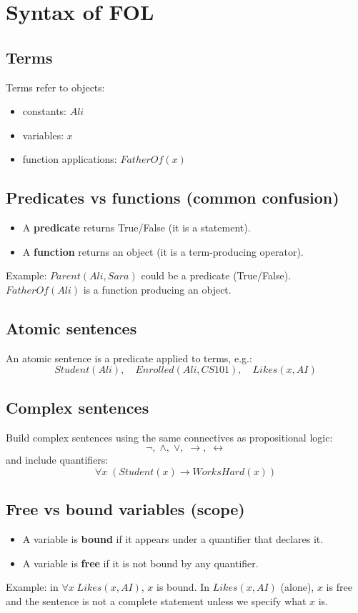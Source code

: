 \documentclass[11pt]{article}
\begin{document}
\section{Syntax of FOL}
\subsection{Terms}
Terms refer to objects:
\begin{itemize}[leftmargin=*]
  \item constants: $Ali$
  \item variables: $x$
  \item function applications: $FatherOf(x)$
\end{itemize}

\subsection{Predicates vs functions (common confusion)}
\begin{itemize}[leftmargin=*]
  \item A \textbf{predicate} returns True/False (it is a statement).
  \item A \textbf{function} returns an object (it is a term-producing operator).
\end{itemize}
Example: $Parent(Ali,Sara)$ could be a predicate (True/False). $FatherOf(Ali)$ is a function producing an object.

\subsection{Atomic sentences}
An atomic sentence is a predicate applied to terms, e.g.:
\[
  Student(Ali),\quad Enrolled(Ali, CS101),\quad Likes(x, AI)
\]

\subsection{Complex sentences}
Build complex sentences using the same connectives as propositional logic:
\[
  \lnot,\; \land,\; \lor,\; \rightarrow,\; \leftrightarrow
\]
and include quantifiers:
\[
  \forall x\; (Student(x) \rightarrow WorksHard(x))
\]

\subsection{Free vs bound variables (scope)}
\begin{itemize}[leftmargin=*]
  \item A variable is \textbf{bound} if it appears under a quantifier that declares it.
  \item A variable is \textbf{free} if it is not bound by any quantifier.
\end{itemize}
Example: in $\forall x\; Likes(x, AI)$, $x$ is bound. In $Likes(x, AI)$ (alone), $x$ is free and the sentence is not a complete statement unless we specify what $x$ is.
\end{document}
